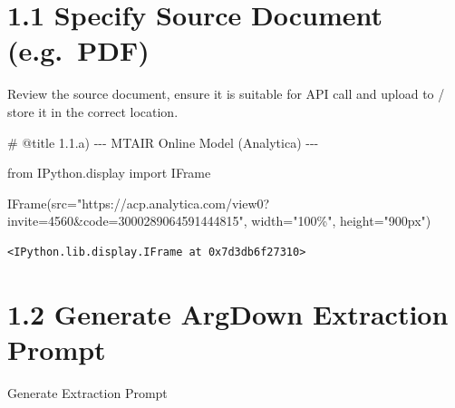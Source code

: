 \documentclass[
  11pt,
  letterpaper,
]{book}
\newenvironment{Shaded}{\begin{snugshade}}{\end{snugshade}}
\newcommand{\CommentTok}[1]{\textcolor[rgb]{0.37,0.37,0.37}{#1}}
\newcommand{\ImportTok}[1]{\textcolor[rgb]{0.00,0.46,0.62}{#1}}
\newcommand{\NormalTok}[1]{\textcolor[rgb]{0.00,0.23,0.31}{#1}}
\newcommand{\OperatorTok}[1]{\textcolor[rgb]{0.37,0.37,0.37}{#1}}
\newcommand{\StringTok}[1]{\textcolor[rgb]{0.13,0.47,0.30}{#1}}
\begin{document}
\section{1.1 Specify Source Document
(e.g.~PDF)}\label{specify-source-document-e.g.-pdf}

Review the source document, ensure it is suitable for API call and
upload to / store it in the correct location.

\begin{Shaded}
\begin{Highlighting}[]
\CommentTok{\# @title 1.1.a) {-}{-}{-} MTAIR Online Model (Analytica) {-}{-}{-}}

\ImportTok{from}\NormalTok{ IPython.display }\ImportTok{import}\NormalTok{ IFrame}

\NormalTok{IFrame(src}\OperatorTok{=}\StringTok{"https://acp.analytica.com/view0?invite=4560\&code=3000289064591444815"}\NormalTok{, width}\OperatorTok{=}\StringTok{"100\%"}\NormalTok{, height}\OperatorTok{=}\StringTok{"900px"}\NormalTok{)}
\end{Highlighting}
\end{Shaded}

\begin{verbatim}
<IPython.lib.display.IFrame at 0x7d3db6f27310>
\end{verbatim}

\section{1.2 Generate ArgDown Extraction
Prompt}\label{generate-argdown-extraction-prompt}

Generate Extraction Prompt
\end{document}
